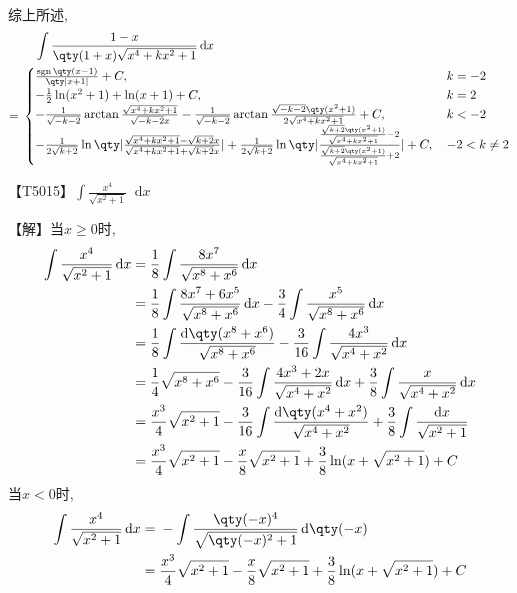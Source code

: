 \documentclass{ctexbook}
\DeclareMathOperator{\sgn}{sgn}
\newcommand*{\dif}{\mathop{}\!\mathrm{d}}
\begin{document}
{\begin{align*}
\end{align*}
综上所述, 
\begin{align*}
{}&\quad\int\frac{1-x}{\qty(1+x)\sqrt{x^{4}+kx^{2}+1}}\dif{x}\\
={}&\begin{cases}
\frac{\sgn{\qty(x-1)}}{\qty|x+1|}+C,{}&k=-2\\
-\frac{1}{2}\ln(x^{2}+1)+\ln(x+1)+C,{}&k=2\\
-\frac{1}{\sqrt{-k-2}}\arctan{\frac{\sqrt{x^{4}+kx^{2}+1}}{\sqrt{-k-2}x}}-\frac{1}{\sqrt{-k-2}}\arctan{\frac{\sqrt{-k-2}\qty(x^{2}+1)}{2\sqrt{x^{4}+kx^{2}+1}}}+C,{}&k<-2\\
-\frac{1}{2\sqrt{k+2}}\ln\qty|\frac{\sqrt{x^{4}+kx^{2}+1}-\sqrt{k+2}x}{\sqrt{x^{4}+kx^{2}+1}+\sqrt{k+2}x}|+\frac{1}{2\sqrt{k+2}}\ln\qty|\frac{\frac{\sqrt{k+2}\qty(x^{2}+1)}{\sqrt{x^{4}+kx^{2}+1}}-2}{\frac{\sqrt{k+2}\qty(x^{2}+1)}{\sqrt{x^{4}+kx^{2}+1}}+2}|+C,{}&-2<k\ne2
\end{cases}
\end{align*}\par
【T5015】$\int\frac{x^{4}}{\sqrt{x^{2}+1}}\dif{x}$\par
【解】当$x\ge0$时, 
\begin{align*}
\int\frac{x^{4}}{\sqrt{x^{2}+1}}\dif{x}={}&\frac{1}{8}\int\frac{8x^{7}}{\sqrt{x^{8}+x^{6}}}\dif{x}\\
={}&\frac{1}{8}\int\frac{8x^{7}+6x^{5}}{\sqrt{x^{8}+x^{6}}}\dif{x}-\frac{3}{4}\int\frac{x^{5}}{\sqrt{x^{8}+x^{6}}}\dif{x}\\
={}&\frac{1}{8}\int\frac{\dif{\qty(x^{8}+x^{6})}}{\sqrt{x^{8}+x^{6}}}-\frac{3}{16}\int\frac{4x^{3}}{\sqrt{x^{4}+x^{2}}}\dif{x}\\
={}&\frac{1}{4}\sqrt{x^{8}+x^{6}}-\frac{3}{16}\int\frac{4x^{3}+2x}{\sqrt{x^{4}+x^{2}}}\dif{x}+\frac{3}{8}\int\frac{x}{\sqrt{x^{4}+x^{2}}}\dif{x}\\
={}&\frac{x^{3}}{4}\sqrt{x^{2}+1}-\frac{3}{16}\int\frac{\dif{\qty(x^{4}+x^{2})}}{\sqrt{x^{4}+x^{2}}}+\frac{3}{8}\int\frac{\dif{x}}{\sqrt{x^{2}+1}}\\
={}&\frac{x^{3}}{4}\sqrt{x^{2}+1}-\frac{x}{8}\sqrt{x^{2}+1}+\frac{3}{8}\ln(x+\sqrt{x^{2}+1})+C
\end{align*}
当$x<0$时, 
\begin{align*}
\int\frac{x^{4}}{\sqrt{x^{2}+1}}\dif{x}={}&-\int\frac{\qty(-x)^{4}}{\sqrt{\qty(-x)^{2}+1}}\dif{\qty(-x)}\\
={}&\frac{x^{3}}{4}\sqrt{x^{2}+1}-\frac{x}{8}\sqrt{x^{2}+1}+\frac{3}{8}\ln(x+\sqrt{x^{2}+1})+C
\end{align*}
}
\end{document}
